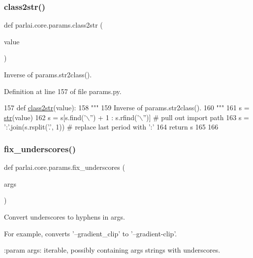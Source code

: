 \subsubsection{\texorpdfstring{class2str()}{class2str()}}
{\footnotesize\ttfamily def parlai.\+core.\+params.\+class2str (\begin{DoxyParamCaption}\item[{}]{value }\end{DoxyParamCaption})}

\begin{DoxyVerb}Inverse of params.str2class().
\end{DoxyVerb}
 

Definition at line 157 of file params.\+py.


\begin{DoxyCode}
157 \textcolor{keyword}{def }\hyperlink{namespaceparlai_1_1core_1_1params_a4abab85fb7a745de31fcc73de5840a60}{class2str}(value):
158     \textcolor{stringliteral}{"""}
159 \textcolor{stringliteral}{    Inverse of params.str2class().}
160 \textcolor{stringliteral}{    """}
161     s = \hyperlink{namespacegenerate__task__READMEs_a5b88452ffb87b78c8c85ececebafc09f}{str}(value)
162     s = s[s.find(\textcolor{stringliteral}{'\(\backslash\)''}) + 1 : s.rfind(\textcolor{stringliteral}{'\(\backslash\)''})]  \textcolor{comment}{# pull out import path}
163     s = \textcolor{stringliteral}{':'}.join(s.rsplit(\textcolor{stringliteral}{'.'}, 1))  \textcolor{comment}{# replace last period with ':'}
164     \textcolor{keywordflow}{return} s
165 
166 
\end{DoxyCode}
\mbox{\label{namespaceparlai_1_1core_1_1params_afe2837a1dc21017be30cc7e3cb3696b8}} 
\subsubsection{\texorpdfstring{fix\+\_\+underscores()}{fix\_underscores()}}
{\footnotesize\ttfamily def parlai.\+core.\+params.\+fix\+\_\+underscores (\begin{DoxyParamCaption}\item[{}]{args }\end{DoxyParamCaption})}

\begin{DoxyVerb}Convert underscores to hyphens in args.

For example, converts '--gradient_clip' to '--gradient-clip'.

:param args: iterable, possibly containing args strings with underscores.
\end{DoxyVerb}
 


